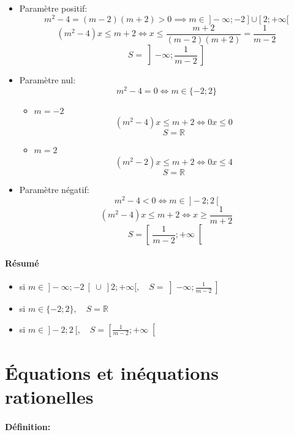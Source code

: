 \documentclass[
    11pt,
    a4paper,
    oneside,
    headinlcude, footinclude,
    twoside,
]{report}
\begin{document}
\begin{itemize}
    \item Paramètre positif: $$m^{2} - 4 = (m-2)(m+2) > 0 \implies m \in \ ]- \infty; -2\ ]
        \cup [\ 2; + \infty[$$
            $$(m^{2} - 4) x \leq m + 2 \iff x \leq \frac{m + 2}{(m-2)(m+2)} =
            \frac{1}{m-2}$$
        $$S = \left] - \infty ; \frac{1}{m-2}\ \right]$$

    \item Paramètre nul: $$m^{2} - 4 = 0 \iff m \in \{-2; 2\}$$
        \begin{itemize}
            \item $m = -2$
                $$(m^{2} - 4) x \leq m + 2 \iff 0x \leq 0$$
                $$S = \mathbb{R}$$

            \item $m = 2$
                $$(m^{2} - 2) x \leq m + 2 \iff 0x \leq 4 $$
                $$S = \mathbb{R}$$
        \end{itemize}

    \item Paramètre négatif: $$m^{2} - 4 < 0 \iff m \in\ ] -2; 2\ [$$
            $$(m^{2} - 4) x \leq  m + 2 \iff x \geq \frac{1}{m+2}$$
            $$S = \left[\ \frac{1}{m-2}; + \infty \right[$$
\end{itemize}


\paragraph{Résumé}

\begin{itemize}
    \item si $ m  \in\ ]-\infty; -2\ [\ \cup\ ]2; + \infty[, \quad S =
            \left]-\infty; \frac{1}{m-2}\ \right]$
    \item si $ m \in \{-2; 2\}, \quad S = \mathbb{R}$
    \item si $ m  \in\ ]-2; 2\ [, \quad S = \left[\frac{1}{m-2}; + \infty\right[$
\end{itemize}

\section{Équations et inéquations rationelles}
\label{sec:equations_et_inequations_rationelles}

\paragraph{Définition:}
\end{document}

